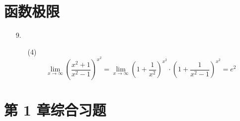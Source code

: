 \documentclass[11pt,oneside,fontset=fandol]{ctexbook} %
\begin{document}
\section{函数极限}

\begin{enumerate}
    \item[9.]
    \begin{enumerate}
        \item[(4)]
        \[
            \lim_{x \to \infty} \left(\frac{x^2+1}{x^2-1}\right)^{x^2} = \lim_{x \to \infty} \left(1+\frac 1 {x^2}\right)^{x^2} \cdot \left(1+\frac 1 {x^2-1}\right)^{x^2} = e^2
        \]
    \end{enumerate}
\end{enumerate}

\section*{第 1 章综合习题}
\end{document}
